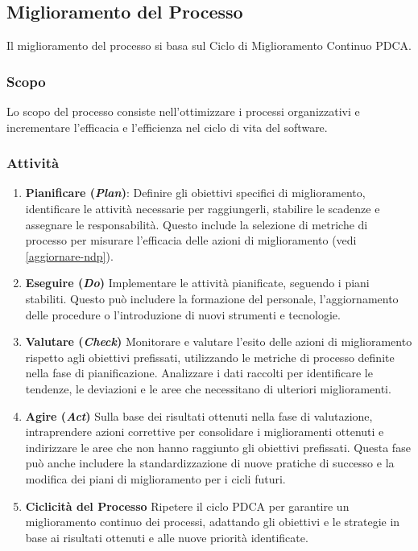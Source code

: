 \subsection{Miglioramento del Processo}

Il miglioramento del processo si basa sul Ciclo di Miglioramento Continuo PDCA.

\subsubsection{Scopo}
Lo scopo del processo consiste nell'ottimizzare i processi organizzativi e
incrementare l'efficacia e l'efficienza nel ciclo di vita del software.

\subsubsection{Attività}
\begin{enumerate}
	\item \textbf{Pianificare (\textit{Plan})}:
	      Definire gli obiettivi specifici di miglioramento, identificare le
	      attività necessarie per raggiungerli, stabilire le scadenze e
	      assegnare le responsabilità. Questo include la selezione di metriche
	      di processo per misurare l'efficacia delle azioni di miglioramento
	      (vedi \autoref{aggiornare-ndp}).

	\item \textbf{Eseguire (\textit{Do})}
	      Implementare le attività pianificate, seguendo i piani stabiliti.
	      Questo può includere la formazione del personale, l'aggiornamento
	      delle procedure o l'introduzione di nuovi strumenti e tecnologie.

	\item \textbf{Valutare (\textit{Check})}
	      Monitorare e valutare l'esito delle azioni di miglioramento rispetto
	      agli obiettivi prefissati, utilizzando le metriche di processo
	      definite nella fase di pianificazione. Analizzare i dati raccolti per
	      identificare le tendenze, le deviazioni e le aree che necessitano di
	      ulteriori miglioramenti.
	\item \textbf{Agire (\textit{Act})}
	      Sulla base dei risultati ottenuti nella fase di valutazione,
	      intraprendere azioni correttive per consolidare i miglioramenti
	      ottenuti e indirizzare le aree che non hanno raggiunto gli obiettivi
	      prefissati. Questa fase può anche includere la standardizzazione di
	      nuove pratiche di successo e la modifica dei piani di miglioramento
	      per i cicli futuri.

	\item \textbf{Ciclicità del Processo}
	      Ripetere il ciclo PDCA per garantire un miglioramento continuo dei
	      processi, adattando gli obiettivi e le strategie in base ai risultati
	      ottenuti e alle nuove priorità identificate.
\end{enumerate}
